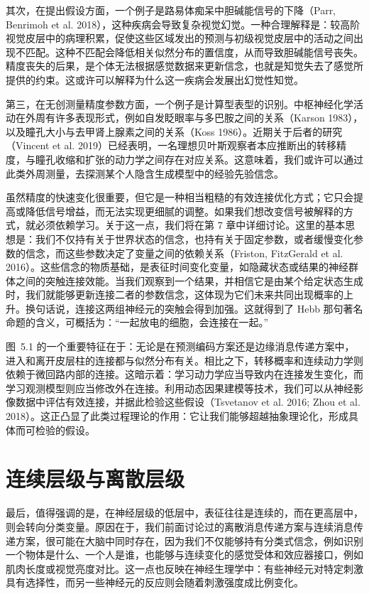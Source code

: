 其次，在提出假设方面，一个例子是路易体痴呆中胆碱能信号的下降（Parr, Benrimoh et al. 2018），这种疾病会导致复杂视觉幻觉。一种合理解释是：较高阶视觉皮层中的病理积累，促使这些区域发出的预测与初级视觉皮层中的活动之间出现不匹配。这种不匹配会降低相关似然分布的置信度，从而导致胆碱能信号丧失。精度丧失的后果，是个体无法根据感觉数据来更新信念，也就是知觉失去了感觉所提供的约束。这或许可以解释为什么这一疾病会发展出幻觉性知觉。

第三，在无创测量精度参数方面，一个例子是计算型表型的识别。中枢神经化学活动在外周有许多表现形式，例如自发眨眼率与多巴胺之间的关系（Karson 1983），以及瞳孔大小与去甲肾上腺素之间的关系（Koss 1986）。近期关于后者的研究（Vincent et al. 2019）已经表明，一名理想贝叶斯观察者本应推断出的转移精度，与瞳孔收缩和扩张的动力学之间存在对应关系。这意味着，我们或许可以通过此类外周测量，去探测某个人隐含生成模型中的经验先验信念。

虽然精度的快速变化很重要，但它是一种相当粗糙的有效连接优化方式；它只会提高或降低信号增益，而无法实现更细腻的调整。如果我们想改变信号被解释的方式，就必须依赖学习。关于这一点，我们将在第 7 章中详细讨论。这里的基本思想是：我们不仅持有关于世界状态的信念，也持有关于固定参数，或者缓慢变化参数的信念，而这些参数决定了变量之间的依赖关系（Friston, FitzGerald et al. 2016）。这些信念的物质基础，是表征时间变化变量，如隐藏状态或结果的神经群体之间的突触连接效能。当我们观察到一个结果，并相信它是由某个给定状态生成时，我们就能够更新连接二者的参数信念，这体现为它们未来共同出现概率的上升。换句话说，连接这两组神经元的突触会得到加强。这就得到了 Hebb 那句著名命题的含义，可概括为：“一起放电的细胞，会连接在一起。”

图~5.1 的一个重要特征在于：无论是在预测编码方案还是边缘消息传递方案中，进入和离开皮层柱的连接都与似然分布有关。相比之下，转移概率和连续动力学则依赖于微回路内部的连接。这暗示着：学习动力学应当导致内在连接发生变化，而学习观测模型则应当修改外在连接。利用动态因果建模等技术，我们可以从神经影像数据中评估有效连接，并据此检验这些假设（Tsvetanov et al. 2016; Zhou et al. 2018）。这正凸显了此类过程理论的作用：它让我们能够超越抽象理论化，形成具体而可检验的假设。

\section{连续层级与离散层级}

最后，值得强调的是，在神经层级的低层中，表征往往是连续的，而在更高层中，则会转向分类变量。原因在于，我们前面讨论过的离散消息传递方案与连续消息传递方案，很可能在大脑中同时存在，因为我们不仅能够持有分类式信念，例如识别一个物体是什么、一个人是谁，也能够与连续变化的感觉受体和效应器接口，例如肌肉长度或视觉亮度对比。这一点也反映在神经生理学中：有些神经元对特定刺激具有选择性，而另一些神经元的反应则会随着刺激强度成比例变化。

